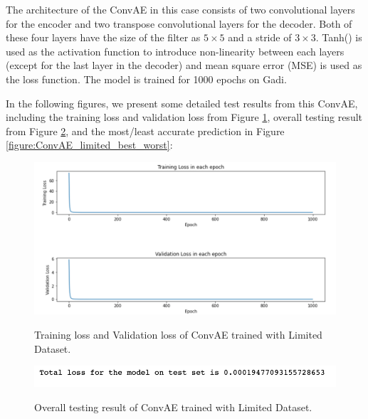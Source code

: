 The architecture of the ConvAE in this case consists of two convolutional layers for the encoder and two transpose convolutional layers for the decoder. Both of these four layers have the size of the filter as $5 \times 5$ and a stride of $3 \times 3$. Tanh() is used as the activation function to introduce non-linearity between each layers (except for the last layer in the decoder) and mean square error (MSE) is used as the loss function. The model is trained for 1000 epochs on Gadi.

In the following figures, we present some detailed test results from this ConvAE, including the training loss and validation loss from Figure \ref{figure:ConvAE_limited_losses}, overall testing result from Figure \ref{figure:ConvAE_limited_testing}, and the most/least accurate prediction in Figure \ref{figure:ConvAE_limited_best_worst}:

\begin{figure}[H]
    \caption{Training loss and Validation loss of ConvAE trained with Limited Dataset.}
    \includegraphics[scale=0.6]{figures/mantle_convection_images/limited_dataset/ConvAE_trainingData.png}
    \label{figure:ConvAE_limited_losses}
\end{figure}

\begin{figure}[H]
    \caption{Overall testing result of ConvAE trained with Limited Dataset.}
    \includegraphics[scale=0.8]{figures/mantle_convection_images/limited_dataset/ConvAE_OverallTesting.png}
    \label{figure:ConvAE_limited_testing}
\end{figure}

